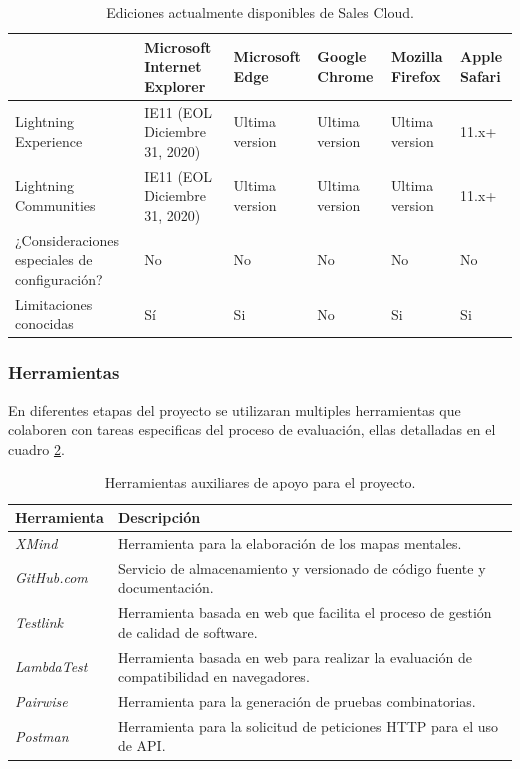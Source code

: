 \begin{table}
\centering
\begin{tabular}{|p{4.5cm}|p{1.9cm}|p{1.9cm}|p{1.9cm}|p{1.9cm}|p{1.9cm}|}
\hline
& \textbf{Microsoft Internet Explorer} & \textbf{Microsoft Edge} & \textbf{Google Chrome} & \textbf{Mozilla Firefox} & \textbf{Apple Safari} \\
\hline
Lightning Experience & IE11 (EOL Diciembre 31, 2020) & Ultima version & Ultima version & Ultima version & 11.x+ \\
Lightning Communities & IE11 (EOL Diciembre 31, 2020) & Ultima version & Ultima version & Ultima version & 11.x+ \\
¿Consideraciones especiales de configuración? & No & No & No & No & No \\
Limitaciones conocidas & Sí & Si & No & Si & Si \\
\hline
\end{tabular}
\caption{Ediciones actualmente disponibles de Sales Cloud.}
\label{soporte_navegadores}
\end{table}

\subsubsection{Herramientas}
En diferentes etapas del proyecto se utilizaran multiples herramientas que
colaboren con tareas especificas del proceso de evaluación, ellas detalladas en
el cuadro \ref{herramientas}.

\begin{table}
\centering
\begin{tabular}{|l|p{13.5cm}|}
\hline
\textbf{Herramienta} & \textbf{Descripción} \\
\hline
\emph{XMind} & Herramienta para la elaboración de los mapas mentales. \\
\emph{GitHub.com} & Servicio de almacenamiento y versionado de código fuente y documentación. \\
\emph{Testlink} & Herramienta basada en web que facilita el proceso de gestión de calidad de software. \\
\emph{LambdaTest} & Herramienta basada en web para realizar la evaluación de compatibilidad en navegadores. \\
\emph{Pairwise} & Herramienta para la generación de pruebas combinatorias. \\
\emph{Postman} & Herramienta para la solicitud de peticiones HTTP para el uso de API.\\
\hline
\end{tabular}
\caption{Herramientas auxiliares de apoyo para el proyecto.}
\label{herramientas}
\end{table}

